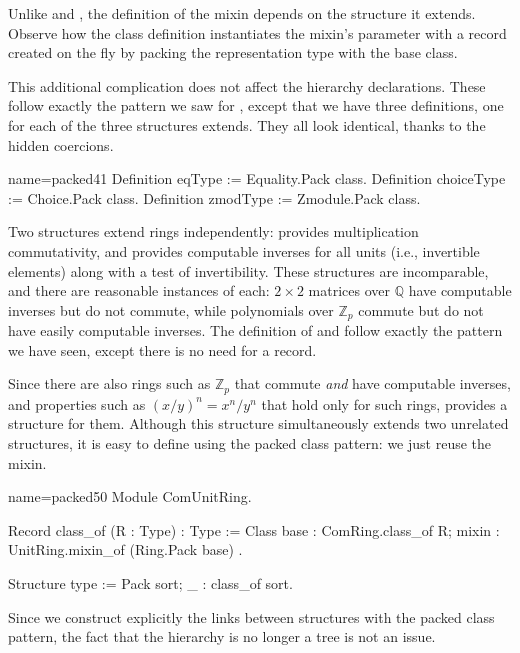 Unlike  and , the definition of the
 mixin depends on the  structure it extends.
Observe how the class definition instantiates the mixin's
 parameter with a record created on the fly by packing
the representation type with the base class.

This additional complication does not affect the hierarchy
declarations.  These follow exactly the pattern we saw for
, except that we have three definitions, one for each of
the three structures  extends. They all look identical,
thanks to the hidden  coercions.

\begin{coq}{name=packed41}{}
Definition eqType := Equality.Pack class.
Definition choiceType := Choice.Pack class.
Definition zmodType := Zmodule.Pack class.
\end{coq}

Two structures extend rings independently:  provides
multiplication commutativity, and  provides computable
inverses for all units (i.e., invertible elements) along with a test
of invertibility. These structures are incomparable, and there are reasonable
instances of each: $2\times 2$ matrices over $\mathbb{Q}$ have
computable inverses but do not commute, while polynomials over
$\mathbb{Z}_p$ commute but do not have easily computable inverses.
The definition of  and  follow exactly
the pattern we have seen,
except there is no need for a  record.

Since there are also rings such as $\mathbb{Z}_p$ that commute
\emph{and} have computable inverses, and properties such as $(x/y)^n =
x ^n / y^n$ that hold only for such rings,  provides a
 structure for them. Although this structure
simultaneously extends two unrelated structures, it is easy to define
using the packed class pattern: we just reuse the 
mixin.

\begin{coq}{name=packed50}{}
Module ComUnitRing.
  
Record class_of (R : Type) : Type := Class {
  base : ComRing.class_of R;
  mixin : UnitRing.mixin_of (Ring.Pack base)
}.

Structure type := Pack {sort; _ : class_of sort}.
\end{coq}

Since we construct explicitly the links between structures with the
packed class pattern, the fact that the hierarchy is no longer a tree
is not an issue.

